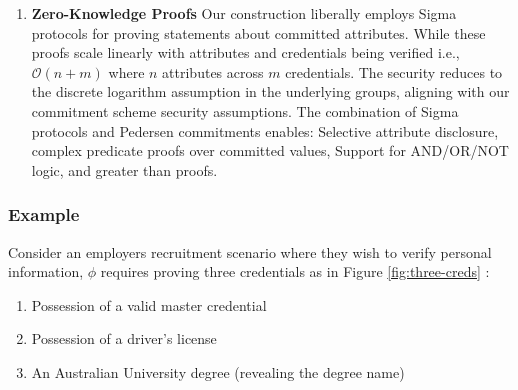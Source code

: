 \begin{enumerate}
    \item \textbf{Zero-Knowledge Proofs} 
    Our construction liberally employs Sigma protocols for proving statements about committed attributes. While these proofs scale linearly with attributes and credentials being verified i.e., $\mathcal{O}(n + m)$ where $n$ attributes across $m$ credentials. The security reduces to the discrete logarithm assumption in the underlying groups, aligning with our commitment scheme security assumptions. The combination of Sigma protocols and Pedersen commitments enables: Selective attribute disclosure, complex predicate proofs over committed values, Support for AND/OR/NOT logic, and greater than proofs.

\end{enumerate}


\subsubsection{Example} Consider an employers recruitment scenario where they wish to verify personal information, $\phi$ requires proving three credentials as in Figure \ref{fig:three-creds} :
\begin{enumerate}
    \item Possession of a valid master credential
    \item Possession of a driver's license
    \item An Australian University degree (revealing the degree name)
\end{enumerate}

